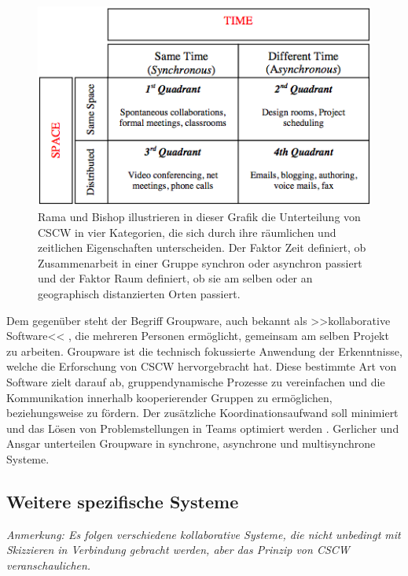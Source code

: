 \begin{figure}[bth]
	\includegraphics[width=\textwidth]{gfx/ramaCSCWQuadranten.png}
	\caption{Rama und Bishop \citep{Rama:2006p245} illustrieren in dieser Grafik die Unterteilung von CSCW in vier Kategorien, die sich durch ihre räumlichen und zeitlichen Eigenschaften unterscheiden. Der Faktor Zeit definiert, ob Zusammenarbeit in einer Gruppe synchron oder asynchron passiert und der Faktor Raum definiert, ob sie am selben oder an geographisch distanzierten Orten passiert.}
	\label{fig:ramaCSCW}
\end{figure}

Dem gegenüber steht der Begriff Groupware, auch bekannt als >>kollaborative Software<< \citep{Bannon:1990p244}, die mehreren Personen ermöglicht, gemeinsam am selben Projekt zu arbeiten. Groupware ist die technisch fokussierte Anwendung der Erkenntnisse, welche die Erforschung von CSCW hervorgebracht hat. Diese bestimmte Art von Software zielt darauf ab, gruppendynamische Prozesse zu vereinfachen und die Kommunikation innerhalb kooperierender Gruppen zu ermöglichen, beziehungsweise zu fördern. Der zusätzliche Koordinationsaufwand soll minimiert und das Lösen von Problemstellungen in Teams optimiert werden \citep{Rama:2006p245}. Gerlicher und Ansgar \citep{Gerlicher:2007p241} unterteilen Groupware in synchrone, asynchrone und multisynchrone Systeme.

\subsection{Weitere spezifische Systeme}

\emph{Anmerkung: \graffito{\(\clubsuit\)} Es folgen verschiedene kollaborative Systeme, die nicht unbedingt mit Skizzieren in Verbindung gebracht werden, aber das Prinzip von CSCW veranschaulichen.}


